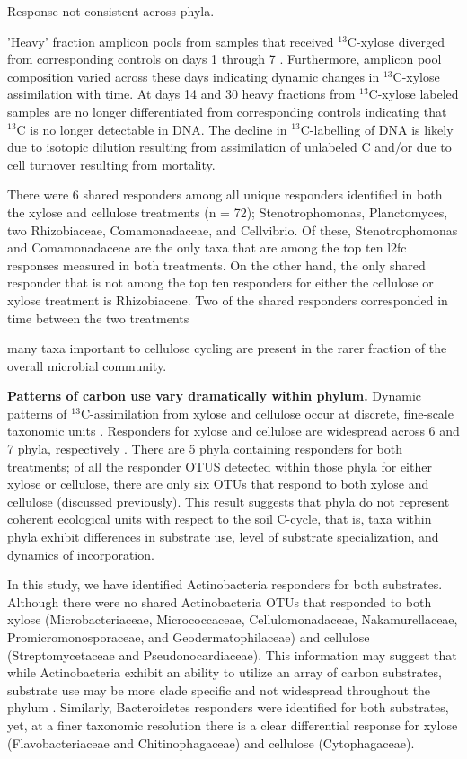 Response not consistent across phyla.

'Heavy' fraction amplicon pools from samples that received $^{13}$C-xylose
diverged from corresponding controls on days 1 through 7 . Furthermore,
amplicon pool composition varied across these days indicating dynamic changes
in $^{13}$C-xylose assimilation with time. At days 14 and 30 heavy fractions
from $^{13}$C-xylose labeled samples are no longer differentiated from
corresponding controls indicating that $^{13}$C is no longer detectable in DNA.
The decline in $^{13}$C-labelling of DNA is likely due to isotopic dilution
resulting from assimilation of unlabeled C and/or due to cell turnover
resulting from mortality. 

There were 6 shared responders among all unique responders identified in both
the xylose and cellulose treatments (n = 72); Stenotrophomonas, Planctomyces,
two Rhizobiaceae, Comamonadaceae, and Cellvibrio. Of these, Stenotrophomonas
and Comamonadaceae are the only taxa that are among the top ten l2fc responses
measured in both treatments. On the other hand, the only shared responder that
is not among the top ten responders for either the cellulose or xylose
treatment is Rhizobiaceae. Two of the shared responders corresponded in time
between the two treatments

many taxa important to cellulose cycling are present in the rarer fraction of the
overall microbial community.

\textbf{Patterns of carbon use vary dramatically within phylum.} Dynamic
patterns of $^{13}$C-assimilation from xylose and cellulose occur at discrete,
fine-scale taxonomic units . Responders for xylose and cellulose are widespread
across 6 and 7 phyla, respectively . There are 5 phyla containing responders
for both treatments; of all the responder OTUS detected within those phyla for
either xylose or cellulose, there are only six OTUs that respond to both xylose
and cellulose (discussed previously). This result suggests that phyla do not
represent coherent ecological units with respect to the soil C-cycle, that is,
taxa within phyla exhibit differences in substrate use, level of substrate
specialization, and dynamics of incorporation. 

In this study, we have identified Actinobacteria responders for both substrates. 
Although there were no shared Actinobacteria OTUs that responded to both
xylose (Microbacteriaceae, Micrococcaceae, Cellulomonadaceae, Nakamurellaceae,
Promicromonosporaceae, and Geodermatophilaceae) and cellulose
(Streptomycetaceae and Pseudonocardiaceae). This information may suggest that
while Actinobacteria exhibit an ability to utilize an array of carbon
substrates, substrate use may be more clade specific and not widespread
throughout the phylum . Similarly, Bacteroidetes responders were identified for
both substrates, yet, at a finer taxonomic resolution there is a clear
differential response for xylose (Flavobacteriaceae and Chitinophagaceae) and
cellulose (Cytophagaceae). 


